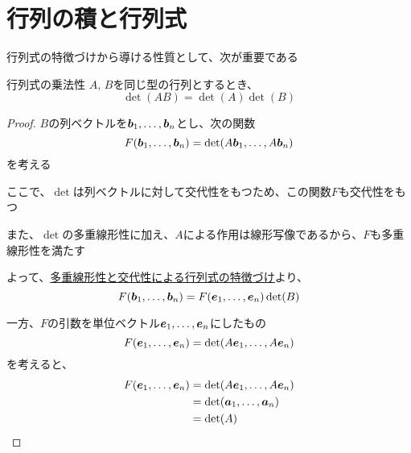 \documentclass[../../../topic_linear-algebra]{subfiles}
\begin{document}
\sectionline
\section{行列の積と行列式}

行列式の特徴づけから導ける性質として、次が重要である

\begin{theorem}{行列式の乗法性}\label{thm:determinant-multiplicativity}
  $A,\,B$を同じ型の行列とするとき、
  \begin{equation*}
    \det(AB) = \det(A) \det(B)
  \end{equation*}
\end{theorem}

\begin{proof}
  $B$の列ベクトルを$\vb*{b}_1, \ldots, \vb*{b}_n$とし、次の関数
  \begin{equation*}
    F(\vb*{b}_1, \ldots, \vb*{b}_n) = \det(A\vb*{b}_1, \ldots, A\vb*{b}_n)
  \end{equation*}
  を考える

  ここで、$\det$は列ベクトルに対して交代性をもつため、この関数$F$も交代性をもつ

  また、$\det$の多重線形性に加え、$A$による作用は線形写像であるから、$F$も多重線形性を満たす

  \br

  よって、\hyperref[thm:determinant-characterization-by-properties]{多重線形性と交代性による行列式の特徴づけ}より、
  \begin{equation*}
    F(\vb*{b}_1, \ldots, \vb*{b}_n) = F(\vb*{e}_1, \ldots, \vb*{e}_n) \det(B)
  \end{equation*}

  \br

  一方、$F$の引数を単位ベクトル$\vb*{e}_1, \ldots, \vb*{e}_n$にしたもの
  \begin{equation*}
    F(\vb*{e}_1, \ldots, \vb*{e}_n) = \det(A\vb*{e}_1, \ldots, A\vb*{e}_n)
  \end{equation*}
  を考えると、
  \begin{align*}
    F(\vb*{e}_1, \ldots, \vb*{e}_n) & = \det(A\vb*{e}_1, \ldots, A\vb*{e}_n) \\
                                    & = \det(\vb*{a}_1, \ldots, \vb*{a}_n)   \\
                                    & = \det(A)
  \end{align*}


\end{proof}
\end{document}
